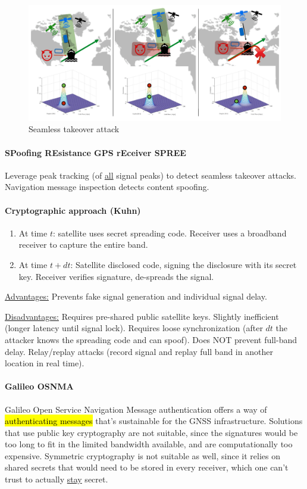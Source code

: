 \begin{figure}[h]
	\centering
	\includegraphics[scale=0.4]{images/4-seamless-takeover.png}
	\caption{Seamless takeover attack}%
	\label{fig:seamless-takeover}
\end{figure}

\paragraph{SPoofing REsistance GPS rEceiver SPREE}
Leverage peak tracking (of \underline{all} signal peaks) to detect seamless
takeover attacks. Navigation message inspection detects content spoofing.

\paragraph{Cryptographic approach (Kuhn)}
\begin{enumerate}
	\item At time $t$: satellite uses secret spreading code. Receiver uses a broadband
	      receiver to capture the entire band.
	\item At time $t+dt$: Satellite disclosed code, signing the disclosure with its
	      secret key. Receiver verifies signature, de-spreads the signal.
\end{enumerate}

\underline{Advantages:}
Prevents fake signal generation and individual signal delay.

\underline{Disadvantages:}
Requires pre-shared public satellite keys.
Slightly inefficient (longer latency until signal lock).
Requires loose synchronization (after $dt$ the attacker knows the spreading code and can spoof).
Does NOT prevent full-band delay.
Relay/replay attacks (record signal and replay full band in another location in real time).

\paragraph{Galileo OSNMA}
Galileo Open Service Navigation Message authentication offers a way of
\hl{authenticating messages} that's sustainable for the GNSS infrastructure.
Solutions that use public key cryptography are not suitable, since the
signatures would be too long to fit in the limited bandwidth available, and are
computationally too expensive. Symmetric cryptography is not suitable as well,
since it relies on shared secrets that would need to be stored in every
receiver, which one can't trust to actually \underline{stay} secret.


